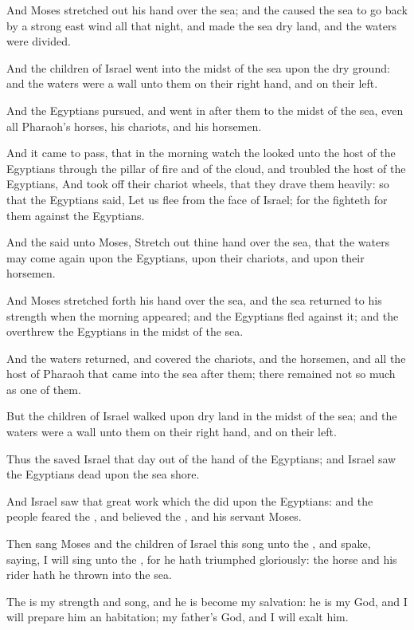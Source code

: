 \Verse And Moses stretched out his hand over the sea; and the \LORD caused the sea to go back by a strong east wind all that night, and made the sea dry land, and the waters were divided.

\Verse And the children of Israel went into the midst of the sea upon the dry ground: and the waters were a wall unto them on their right hand, and on their left.

\Verse And the Egyptians pursued, and went in after them to the midst of the sea, even all Pharaoh's horses, his chariots, and his horsemen.

\Verse And it came to pass, that in the morning watch the \LORD looked unto the host of the Egyptians through the pillar of fire and of the cloud, and troubled the host of the Egyptians, \Verse And took off their chariot wheels, that they drave them heavily: so that the Egyptians said, Let us flee from the face of Israel; for the \LORD fighteth for them against the Egyptians.

\Verse And the \LORD said unto Moses, Stretch out thine hand over the sea, that the waters may come again upon the Egyptians, upon their chariots, and upon their horsemen.

\Verse And Moses stretched forth his hand over the sea, and the sea returned to his strength when the morning appeared; and the Egyptians fled against it; and the \LORD overthrew the Egyptians in the midst of the sea.

\Verse And the waters returned, and covered the chariots, and the horsemen, and all the host of Pharaoh that came into the sea after them; there remained not so much as one of them.

\Verse But the children of Israel walked upon dry land in the midst of the sea; and the waters were a wall unto them on their right hand, and on their left.

\Verse Thus the \LORD saved Israel that day out of the hand of the Egyptians; and Israel saw the Egyptians dead upon the sea shore.

\Verse And Israel saw that great work which the \LORD did upon the Egyptians: and the people feared the \LORD, and believed the \LORD, and his servant Moses.

\Chapter
\Verse Then sang Moses and the children of Israel this song unto the \LORD, and spake, saying, I will sing unto the \LORD, for he hath triumphed gloriously: the horse and his rider hath he thrown into the sea.

\Verse The \LORD is my strength and song, and he is become my salvation: he is my God, and I will prepare him an habitation; my father's God, and I will exalt him.

